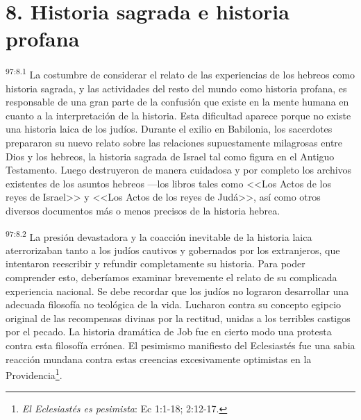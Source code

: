 \section*{8. Historia sagrada e historia profana}
\par
\textsuperscript{97:8.1} La costumbre de considerar el relato de las experiencias de los hebreos como historia sagrada, y las actividades del resto del mundo como historia profana, es responsable de una gran parte de la confusión que existe en la mente humana en cuanto a la interpretación de la historia. Esta dificultad aparece porque no existe una historia laica de los judíos. Durante el exilio en Babilonia, los sacerdotes prepararon su nuevo relato sobre las relaciones supuestamente milagrosas entre Dios y los hebreos, la historia sagrada de Israel tal como figura en el Antiguo Testamento. Luego destruyeron de manera cuidadosa y por completo los archivos existentes de los asuntos hebreos ---los libros tales como <<Los Actos de los reyes de Israel>> y <<Los Actos de los reyes de Judá>>, así como otros diversos documentos más o menos precisos de la historia hebrea.

\par
\textsuperscript{97:8.2} La presión devastadora y la coacción inevitable de la historia laica aterrorizaban tanto a los judíos cautivos y gobernados por los extranjeros, que intentaron reescribir y refundir completamente su historia. Para poder comprender esto, deberíamos examinar brevemente el relato de su complicada experiencia nacional. Se debe recordar que los judíos no lograron desarrollar una adecuada filosofía no teológica de la vida. Lucharon contra su concepto egipcio original de las recompensas divinas por la rectitud, unidas a los terribles castigos por el pecado. La historia dramática de Job fue en cierto modo una protesta contra esta filosofía errónea. El pesimismo manifiesto del Eclesiastés fue una sabia reacción mundana contra estas creencias excesivamente optimistas en la Providencia\footnote{\textit{El Eclesiastés es pesimista}: Ec 1:1-18; 2:12-17.}.


